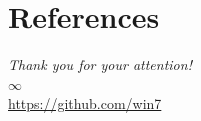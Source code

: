 \documentclass{beamer}
\begin{document}
\section*{References}
    \begin{frame}
        \begin{center}
            {\Huge\textit{Thank you for your attention!}}\\
            $\infty$ \\
            \url{https://github.com/win7}
        \end{center}
    \end{frame}
    
    \begin{frame}[allowframebreaks]
        \scriptsize %
        
        
    \end{frame}
\end{document}
